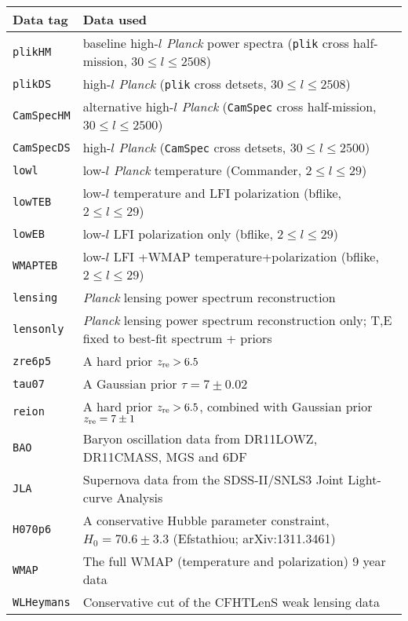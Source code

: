 \begin{tabular} { l   l  }
Data tag & Data used\\
\hline
{\tt plikHM}         & baseline high-$l$ \textit{Planck} power spectra ({\tt plik} cross half-mission, $30\le l\le 2508$) \\
{\tt plikDS}         & high-$l$ \textit{Planck} ({\tt plik} cross detsets, $30\le l\le 2508$) \\
{\tt CamSpecHM}      & alternative high-$l$ \textit{Planck}  ({\tt CamSpec} cross half-mission, $30\le l\le 2500$) \\
{\tt CamSpecDS}      & high-$l$ \textit{Planck} ({\tt CamSpec} cross detsets, $30\le l\le 2500$) \\
{\tt lowl }          & low-$l$ \textit{Planck} temperature (Commander, $2\le l \le 29$)  \\
{\tt lowTEB}         & low-$l$ temperature and LFI polarization (bflike, $2\le l \le 29$)\\
{\tt lowEB}          & low-$l$  LFI polarization only (bflike, $2\le l \le 29$)\\
{\tt WMAPTEB}       & low-$l$  LFI +WMAP temperature+polarization (bflike, $2\le l \le 29$)\\
{\tt lensing}        & \textit{Planck}  lensing power spectrum reconstruction\\
{\tt lensonly}       & \textit{Planck}  lensing power spectrum reconstruction only; T,E fixed to best-fit spectrum + priors\\
{\tt zre6p5}         & A hard prior $z_{\rm re} > 6.5$\\
{\tt tau07}          & A Gaussian prior $\tau = 7 \pm 0.02$\\
{\tt reion}          & A hard prior $z_{\rm re} > 6.5$, combined with Gaussian prior $z_{\rm re} = 7\pm 1$\\
{\tt BAO}            & Baryon oscillation data from DR11LOWZ, DR11CMASS, MGS and 6DF \\
{\tt JLA}            & Supernova data from the SDSS-II/SNLS3 Joint Light-curve Analysis \\
{\tt H070p6}         & A conservative Hubble parameter constraint, $H_0 = 70.6\pm 3.3$ (Efstathiou; arXiv:1311.3461) \\
{\tt WMAP}           & The full WMAP (temperature and polarization) 9 year data \\
{\tt WLHeymans}      & Conservative cut of the CFHTLenS weak lensing data  \\
\hline
\end{tabular}
